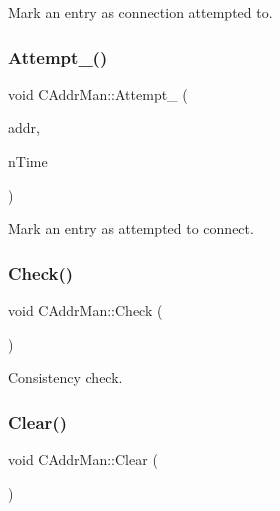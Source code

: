 Mark an entry as connection attempted to. 

\mbox{\label{class_c_addr_man_ab1a1bfa8b435ef139570c88de1a5245f}} 
\subsubsection{\texorpdfstring{Attempt\+\_\+()}{Attempt\_()}}
{\footnotesize\ttfamily void C\+Addr\+Man\+::\+Attempt\+\_\+ (\begin{DoxyParamCaption}\item[{const \mbox{\hyperlink{class_c_service}{C\+Service}} \&}]{addr,  }\item[{int64\+\_\+t}]{n\+Time }\end{DoxyParamCaption})\hspace{0.3cm}{\ttfamily [protected]}}



Mark an entry as attempted to connect. 

\mbox{\label{class_c_addr_man_a0c2677ae50ce0d680f0105b285d1f5d0}} 
\subsubsection{\texorpdfstring{Check()}{Check()}}
{\footnotesize\ttfamily void C\+Addr\+Man\+::\+Check (\begin{DoxyParamCaption}{ }\end{DoxyParamCaption})\hspace{0.3cm}{\ttfamily [inline]}}



Consistency check. 

\mbox{\label{class_c_addr_man_a53c27520b7f8c6fa817c2fa869dd4e25}} 
\subsubsection{\texorpdfstring{Clear()}{Clear()}}
{\footnotesize\ttfamily void C\+Addr\+Man\+::\+Clear (\begin{DoxyParamCaption}{ }\end{DoxyParamCaption})\hspace{0.3cm}{\ttfamily [inline]}}

